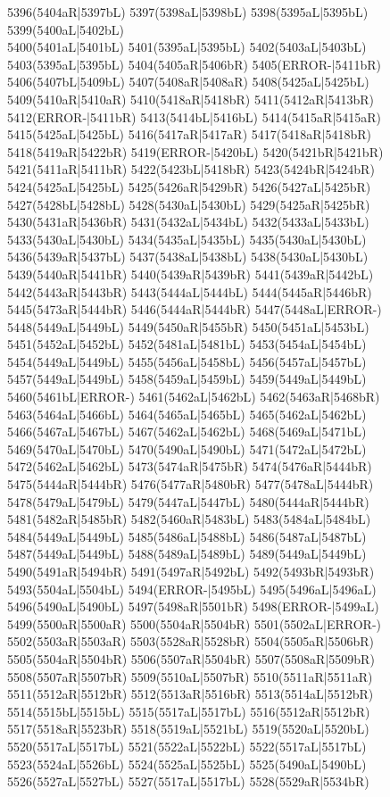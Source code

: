 5396(5404aR|5397bL) 5397(5398aL|5398bL) 5398(5395aL|5395bL) 5399(5400aL|5402bL) \\5400(5401aL|5401bL) 5401(5395aL|5395bL) 5402(5403aL|5403bL) 5403(5395aL|5395bL) 5404(5405aR|5406bR) 5405(ERROR-|5411bR) 5406(5407bL|5409bL) 5407(5408aR|5408aR) 5408(5425aL|5425bL) \\5409(5410aR|5410aR) 5410(5418aR|5418bR) 5411(5412aR|5413bR) 5412(ERROR-|5411bR) 5413(5414bL|5416bL) 5414(5415aR|5415aR) 5415(5425aL|5425bL) 5416(5417aR|5417aR) 5417(5418aR|5418bR) \\5418(5419aR|5422bR) 5419(ERROR-|5420bL) 5420(5421bR|5421bR) 5421(5411aR|5411bR) 5422(5423bL|5418bR) 5423(5424bR|5424bR) 5424(5425aL|5425bL) 5425(5426aR|5429bR) 5426(5427aL|5425bR) \\5427(5428bL|5428bL) 5428(5430aL|5430bL) 5429(5425aR|5425bR) 5430(5431aR|5436bR) 5431(5432aL|5434bL) 5432(5433aL|5433bL) 5433(5430aL|5430bL) 5434(5435aL|5435bL) 5435(5430aL|5430bL) \\5436(5439aR|5437bL) 5437(5438aL|5438bL) 5438(5430aL|5430bL) 5439(5440aR|5441bR) 5440(5439aR|5439bR) 5441(5439aR|5442bL) 5442(5443aR|5443bR) 5443(5444aL|5444bL) 5444(5445aR|5446bR) \\5445(5473aR|5444bR) 5446(5444aR|5444bR) 5447(5448aL|ERROR-) 5448(5449aL|5449bL) 5449(5450aR|5455bR) 5450(5451aL|5453bL) 5451(5452aL|5452bL) 5452(5481aL|5481bL) 5453(5454aL|5454bL) \\5454(5449aL|5449bL) 5455(5456aL|5458bL) 5456(5457aL|5457bL) 5457(5449aL|5449bL) 5458(5459aL|5459bL) 5459(5449aL|5449bL) 5460(5461bL|ERROR-) 5461(5462aL|5462bL) 5462(5463aR|5468bR) \\5463(5464aL|5466bL) 5464(5465aL|5465bL) 5465(5462aL|5462bL) 5466(5467aL|5467bL) 5467(5462aL|5462bL) 5468(5469aL|5471bL) 5469(5470aL|5470bL) 5470(5490aL|5490bL) 5471(5472aL|5472bL) \\5472(5462aL|5462bL) 5473(5474aR|5475bR) 5474(5476aR|5444bR) 5475(5444aR|5444bR) 5476(5477aR|5480bR) 5477(5478aL|5444bR) 5478(5479aL|5479bL) 5479(5447aL|5447bL) 5480(5444aR|5444bR) \\5481(5482aR|5485bR) 5482(5460aR|5483bL) 5483(5484aL|5484bL) 5484(5449aL|5449bL) 5485(5486aL|5488bL) 5486(5487aL|5487bL) 5487(5449aL|5449bL) 5488(5489aL|5489bL) 5489(5449aL|5449bL) \\5490(5491aR|5494bR) 5491(5497aR|5492bL) 5492(5493bR|5493bR) 5493(5504aL|5504bL) 5494(ERROR-|5495bL) 5495(5496aL|5496aL) 5496(5490aL|5490bL) 5497(5498aR|5501bR) 5498(ERROR-|5499aL) \\5499(5500aR|5500aR) 5500(5504aR|5504bR) 5501(5502aL|ERROR-) 5502(5503aR|5503aR) 5503(5528aR|5528bR) 5504(5505aR|5506bR) 5505(5504aR|5504bR) 5506(5507aR|5504bR) 5507(5508aR|5509bR) \\5508(5507aR|5507bR) 5509(5510aL|5507bR) 5510(5511aR|5511aR) 5511(5512aR|5512bR) 5512(5513aR|5516bR) 5513(5514aL|5512bR) 5514(5515bL|5515bL) 5515(5517aL|5517bL) 5516(5512aR|5512bR) \\5517(5518aR|5523bR) 5518(5519aL|5521bL) 5519(5520aL|5520bL) 5520(5517aL|5517bL) 5521(5522aL|5522bL) 5522(5517aL|5517bL) 5523(5524aL|5526bL) 5524(5525aL|5525bL) 5525(5490aL|5490bL) \\5526(5527aL|5527bL) 5527(5517aL|5517bL) 5528(5529aR|5534bR) 